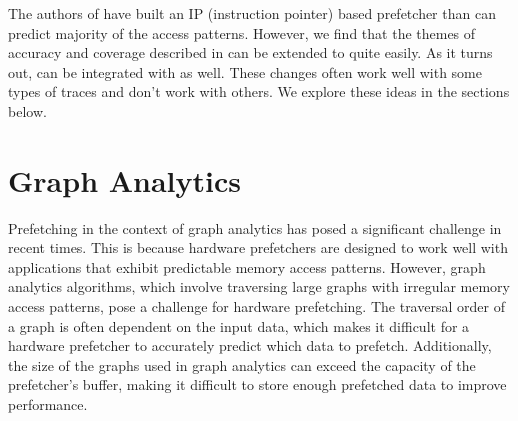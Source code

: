 \documentclass[conference]{IEEEtran}
\begin{document}
The authors of \cite{b1} have built an IP (instruction pointer) based prefetcher than can predict majority of the access patterns. However, we find that the themes of accuracy and coverage described in \cite{b2} can be extended to \cite{b1} quite easily. As it turns out, \cite{b3} can be integrated with \cite{b1} as well. These changes often work well with some types of traces and don't work with others. We explore these ideas in the sections below. 

\section{Graph Analytics}
Prefetching in the context of graph analytics has posed a significant challenge in recent times. This is because hardware prefetchers are designed to work well with applications that exhibit predictable memory access patterns. However, graph analytics algorithms, which involve traversing large graphs with irregular memory access patterns, pose a challenge for hardware prefetching. The traversal order of a graph is often dependent on the input data, which makes it difficult for a hardware prefetcher to accurately predict which data to prefetch. Additionally, the size of the graphs used in graph analytics can exceed the capacity of the prefetcher's buffer, making it difficult to store enough prefetched data to improve performance. 
\end{document}
